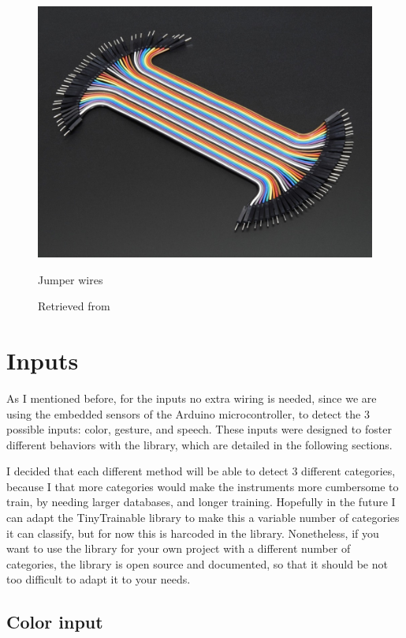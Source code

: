 \begin{figure}[ht]
  \centering
  \includegraphics[width=0.75\linewidth,height=0.25\textheight,keepaspectratio]{images/materials-adafruit-jumper-wires.jpg}
  \caption{Jumper wires}
  \caption*{Retrieved from \cite{website-materials-adafruit-jumper-wires}}
  \label{fig:materials-adafruit-jumper-wires}
\end{figure}

\section{Inputs}

As I mentioned before, for the inputs no extra wiring is needed, since we are using the embedded sensors of the Arduino microcontroller, to detect the 3 possible inputs: color, gesture, and speech. These inputs were designed to foster different behaviors with the library, which are detailed in the following sections.

I decided that each different method will be able to detect 3 different categories, because I that more categories would make the instruments more cumbersome to train, by needing larger databases, and longer training. Hopefully in the future I can adapt the TinyTrainable library to make this a variable number of categories it can classify, but for now this is harcoded in the library. Nonetheless, if you want to use the library for your own project with a different number of categories, the library is open source and documented, so that it should be not too difficult to adapt it to your needs.

\subsection{Color input}

